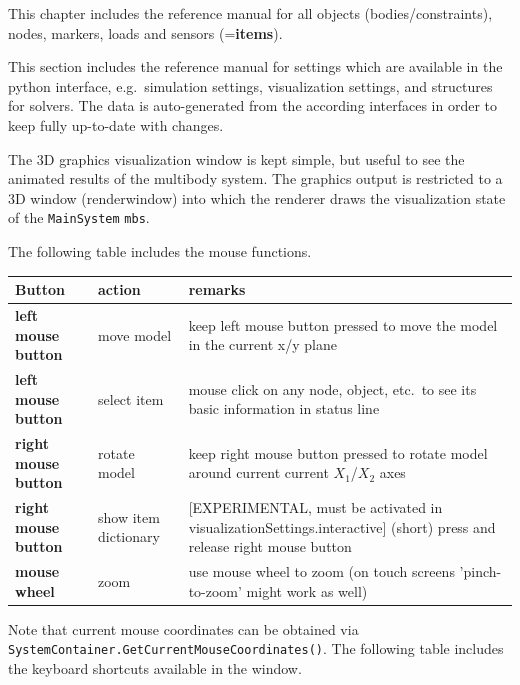 \documentclass[11pt,a4paper]{book}
\begin{document}
 \label{sec:theory}


 \label{sec:item:reference:manual}
This chapter includes the reference manual for all objects (bodies/constraints), nodes, markers, loads and sensors ({=\bf items}).



This section includes the reference manual for settings which are available in the python interface, e.g.\ simulation settings, visualization settings, and structures for solvers. The data is auto-generated from the according interfaces in order to keep fully 
up-to-date with changes.




The 3D graphics visualization window is kept simple, but useful to see the animated results of the multibody system.
The graphics output is restricted to a 3D window (renderwindow) into which the renderer draws the visualization state of the \texttt{MainSystem} \texttt{mbs}.

The following table includes the mouse functions. 

\begin{center}
  \footnotesize
  \begin{longtable}{| p{4cm} | p{4cm} | p{8cm} |} 
	\hline
  \bf Button & action & \bf remarks \\ \hline
  \bf left mouse button & move model & keep left mouse button pressed to move the model in the current x/y plane\\ \hline
  \bf left mouse button & select item & mouse click on any node, object, etc.\ to see its basic information in status line \\ \hline
  \bf right mouse button & rotate model & keep right mouse button pressed to rotate model around current current $X_1$/$X_2$ axes\\
	\bf right mouse button & show item dictionary & [EXPERIMENTAL, must be activated in visualizationSettings.interactive] (short) press and release right mouse button \\ \hline
\hline
  \bf mouse wheel & zoom & use mouse wheel to zoom (on touch screens 'pinch-to-zoom' might work as well) \\ \hline
  \end{longtable}
\end{center}
Note that current mouse coordinates can be obtained via 
\texttt{SystemContainer.GetCurrentMouseCoordinates()}.
The following table includes the keyboard shortcuts available in the window. 
\end{document}
